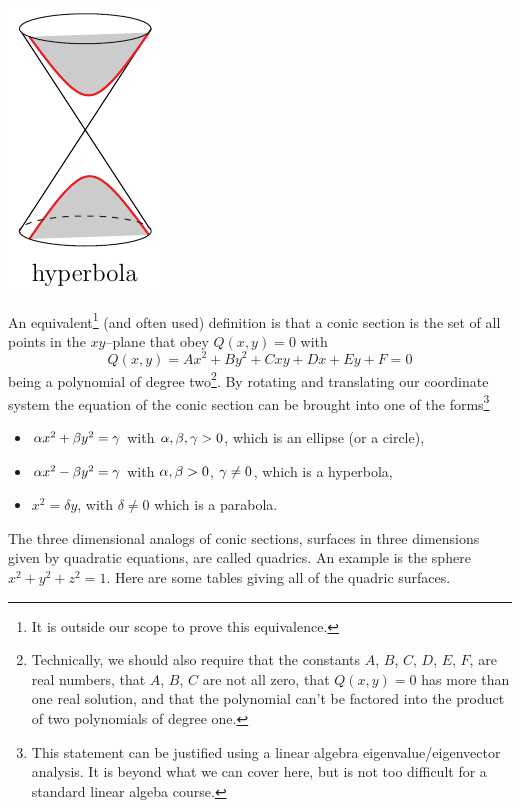 {\begin{efig}
\begin{center}
    \includegraphics{conePlaneHyperbola.pdf}
\end{center}
\end{efig}
}
An equivalent\footnote{It is outside our scope to prove this equivalence.} 
(and often used) definition is that a conic section is the set of all points  
in the $xy$--plane that obey $Q(x,y)=0$ with
\begin{equation*}
Q(x,y) = Ax^2 + By^2 + Cxy + Dx + Ey + F =0
\end{equation*}
being a polynomial of degree two\footnote{Technically, we should also require
that the constants $A$, $B$, $C$, $D$, $E$, $F$, are real numbers,
that $A$, $B$, $C$ are not all zero, that $Q(x,y)=0$ has more than one 
real solution, and that the polynomial can't be factored
into the product of two polynomials of degree one.}.
By rotating and translating  our coordinate system the equation of the conic section can be brought
into one of the forms\footnote{This statement can be justified using a 
linear algebra eigenvalue/eigenvector analysis. It is 
beyond what we can cover here, but is not too difficult for a standard 
linear algeba course.}
\begin{itemize}
\item
$\alpha x^2 + \beta y^2 =\gamma$ with $\alpha,\beta,\gamma >0$, which is an ellipse
(or a circle),
\item
$\alpha x^2 - \beta y^2 =\gamma$ with $\alpha,\beta>0$, $\gamma\ne0$, which is a hyperbola,
\item 
$x^2 = \delta y$, with $\delta\ne 0$ which is a parabola.
\end{itemize}
\goodbreak

The three dimensional analogs of conic sections, surfaces 
in three dimensions given by quadratic equations, are called quadrics.
An example is the sphere $x^2+y^2+z^2=1$. Here are some tables giving
all of the quadric surfaces.

